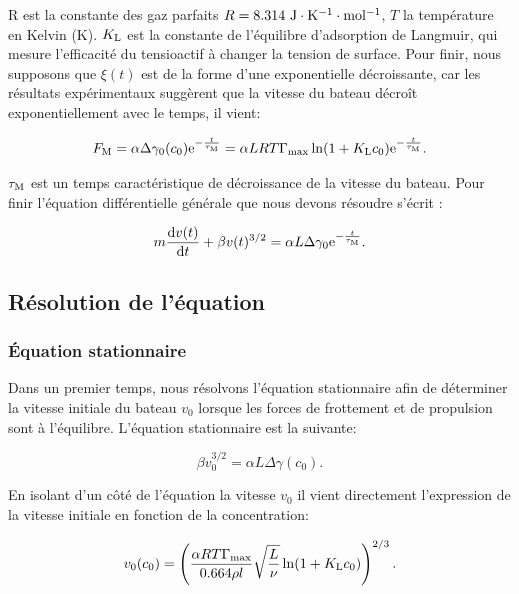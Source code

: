 \documentclass[french, 10pt]{article}
\begin{document}
R est la constante des gaz parfaits $R = 8.314~\rm J\cdot K^{-1}\cdot mol^{-1}$, $T$ la température en Kelvin (K). $K_{\rm L}$ est la constante de l'équilibre d'adsorption de Langmuir, qui mesure l'efficacité du tensioactif à changer la tension de surface. Pour finir, nous supposons que $\xi(t)$ est de la forme d'une exponentielle décroissante, car les résultats expérimentaux suggèrent que la vitesse du bateau décroît exponentiellement avec le temps, il vient:

\begin{equation}
  F_{\rm M} = \alpha \Delta\gamma_0(c_0){\rm e}^{-\frac{t}{\tau_{\rm M}}}= \alpha LRT\Gamma_{\rm max}\ln(1+K_{\rm L}c_0){\rm e}^{-\frac{t}{\tau_{\rm M}}}.
\end{equation}

$\tau_{\rm M}$ est un temps caractéristique de décroissance de la vitesse du bateau. Pour finir l'équation différentielle générale que nous devons résoudre s'écrit :

\begin{equation}
  m\frac{\mathrm{d}v(t)}{\mathrm{d}t} + \beta v(t)^{3/2} = \alpha L\Delta\gamma_0{\rm e}^{-\frac{t}{\tau_{\rm M}}}.
  \label{eqn:differentielle}
\end{equation}



\subsection{Résolution de l'équation}

\subsubsection{Équation stationnaire}

Dans un premier temps, nous résolvons l'équation stationnaire afin de déterminer la vitesse initiale du bateau $v_0$ lorsque les forces de frottement et de propulsion sont à l'équilibre. L'équation stationnaire est la suivante:

\begin{equation}
  \beta v_0^{3/2} = \alpha L\Delta\gamma(c_0).\label{eq:stationnaire}
\end{equation}


En isolant d'un côté de l'équation la vitesse $v_0$ il vient directement l'expression de la vitesse initiale en fonction de la concentration:

\begin{equation}
  v_0(c_0)=\left(\frac{\alpha RT\Gamma_{\rm max}}{0.664\rho l}\sqrt{\frac{L}{\nu}}\ln(1+K_{\rm L}c_0)\right)^{2/3}.
  \label{eqn:v0}
\end{equation}
\end{document}
